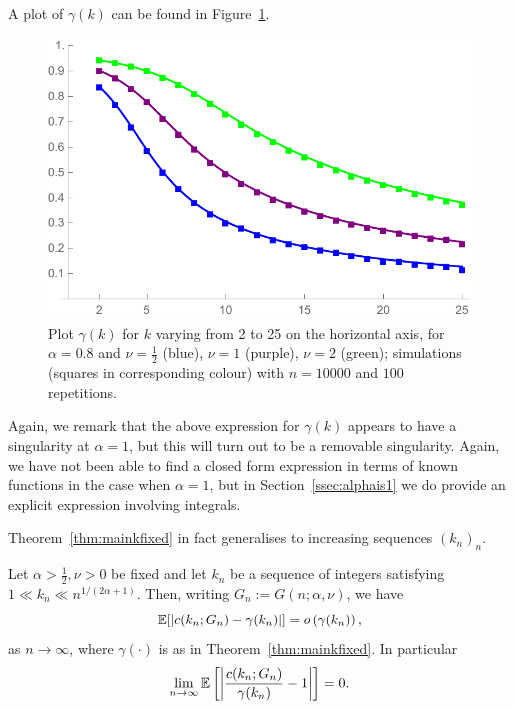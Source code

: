 \noindent
A plot of $\gamma(k)$ can be found in Figure~\ref{fig:gammak}. %
%
%
\begin{figure}[h!]
    \centering
    \includegraphics[scale=0.6]{figures/ckn10000a08nu0512rep100k2to25Squares.pdf}
    \caption{Plot $\gamma(k)$ for $k$ varying from 2 to 25 on the horizontal axis, for $\alpha=0.8$ and $\nu=\frac{1}{2}$ 
    (blue), $\nu=1$ (purple), $\nu=2$ (green); simulations (squares in corresponding colour) with $n=10000$ and $100$ repetitions.\label{fig:gammak}}
\end{figure}%
%
Again, we remark that the above expression for $\gamma(k)$ appears to have a singularity at $\alpha=1$, but this will turn out to be a removable singularity. Again, we have not been able to find a closed form expression in terms of known functions in the case when $\alpha=1$, but in Section~\ref{ssec:alphais1} we do provide an explicit expression involving integrals.

Theorem~\ref{thm:mainkfixed} in fact generalises to increasing sequences $(k_n)_n$.

\begin{theorem}\label{thm:mainktoinfty}
Let $\alpha>\frac12, \nu>0$ be fixed and let $k_n$ be a sequence of integers
satisfying $1 \ll k_n \ll n^{1/(2\alpha+1)}$. Then, writing $G_n := G(n;\alpha,\nu)$, we have
\[
	\mathbb{E}[|c(k_n;G_n)-\gamma(k_n)|] = o\left(\gamma(k_n)\right),
\]
as $n \to \infty$, where $\gamma(\cdot)$ is as in Theorem~\ref{thm:mainkfixed}. In particular
\[
	\lim_{n \to \infty} \mathbb{E}\left[\left|\frac{c(k_n; G_n)}{\gamma(k_n)}- 1 \right|\right] = 0.
\]
\end{theorem}


